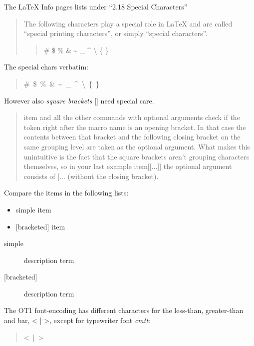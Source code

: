\documentclass[a4paper]{article}
\providecommand*{\DUroletitlereference}[1]{\textsl{#1}}
\begin{document}
The LaTeX Info pages lists under ``2.18 Special Characters''
%
\begin{quote}

The following characters play a special role in LaTeX and are called
``special printing characters'', or simply ``special characters''.
%
\begin{quote}

\# \$ \% \& \textasciitilde{} \_ \textasciicircum{} \textbackslash{} \{ \}

\end{quote}

\end{quote}

The special chars verbatim:
%
\begin{quote}{\ttfamily \raggedright \noindent
\#~\$~\%~\&~\textasciitilde{}~\_~\textasciicircum{}~\textbackslash{}~\{~\}
}
\end{quote}

However also \emph{square brackets} {[}{]} need special care.
%
\begin{quote}

item and all the other commands with optional arguments check
if the token right after the macro name is an opening bracket.
In that case the contents between that bracket and the following
closing bracket on the same grouping level are taken as the
optional argument. What makes this unintuitive is the fact that
the square brackets aren't grouping characters themselves, so in
your last example item{[}{[}...{]}{]} the optional argument consists of
{[}... (without the closing bracket).

\end{quote}

Compare the items in the following lists:
%
\begin{itemize}

\item simple item

\item {[}bracketed{]} item

\end{itemize}
%
\begin{description}
\item[{simple}] \leavevmode 
description term

\item[{{[}bracketed{]}}] \leavevmode 
description term

\end{description}

The OT1 font-encoding has different characters for the less-than,
greater-than and bar, < | >, except for typewriter font \DUroletitlereference{cmtt}:
%
\begin{quote}{\ttfamily \raggedright \noindent
<~|~>
}
\end{quote}
\end{document}
